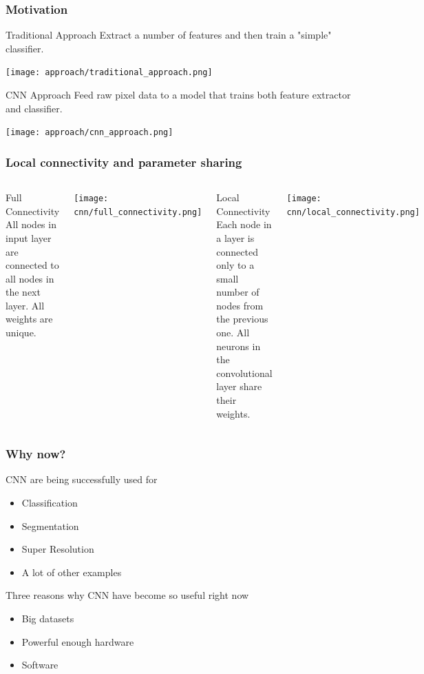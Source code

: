 \documentclass{beamer}
\begin{document}
%
%

\begin{frame}
\frametitle{Motivation}

\begin{block}{Traditional Approach}
Extract a number of features and then train a "simple" classifier.
\end{block}
\texttt{[image: approach/traditional\_approach.png]}

\begin{block}{CNN Approach}
Feed raw pixel data to a model that trains both feature extractor and classifier.
\end{block}
\texttt{[image: approach/cnn\_approach.png]}

\end{frame}

\begin{frame}
\frametitle{Local connectivity and parameter sharing}
\begin{columns}
\begin{block}{Full Connectivity}
All nodes in input layer are connected to all nodes in the next layer. All weights are unique.
\end{block}
\vskip 0.55in
\texttt{[image: cnn/full\_connectivity.png]}
\begin{block}{Local Connectivity}
Each node in a layer is connected only to a small number of nodes from the previous one. All neurons in the convolutional layer share their
weights.	
\end{block}
\vskip 0.2in
\texttt{[image: cnn/local\_connectivity.png]}
\end{columns}
\end{frame}

\begin{frame}
\frametitle{Why now?}

CNN are being successfully used for
\begin{itemize}
\item Classification
\item Segmentation
\item Super Resolution
\item A lot of other examples
\end{itemize}

\vskip 0.3in

Three reasons why CNN have become so useful right now
\begin{itemize}
\item Big datasets
\item Powerful enough hardware
\item Software
\end{itemize}

\end{frame}
\end{document}

